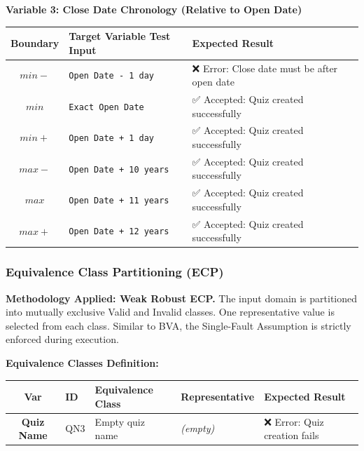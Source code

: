 \documentclass[twoside,final]{hcmut-report}
\begin{document}
\vspace{0.3cm}
\noindent\textbf{Variable 3: Close Date Chronology (Relative to Open Date)}
\begin{table}[H]
\centering
\renewcommand{\arraystretch}{1.2}
\begin{tabularx}{\textwidth}{|c|l|X|}
\hline
\textbf{Boundary} & \textbf{Target Variable Test Input} & \textbf{Expected Result} \\ \hline
$min-$ & \texttt{Open Date - 1 day} & ❌ Error: Close date must be after open date \\ \hline
$min$ & \texttt{Exact Open Date} & ✅ Accepted: Quiz created successfully \\ \hline
$min+$ & \texttt{Open Date + 1 day} & ✅ Accepted: Quiz created successfully \\ \hline
$max-$ & \texttt{Open Date + 10 years} & ✅ Accepted: Quiz created successfully \\ \hline
$max$ & \texttt{Open Date + 11 years} & ✅ Accepted: Quiz created successfully \\ \hline
$max+$ & \texttt{Open Date + 12 years} & ✅ Accepted: Quiz created successfully \\ \hline
\end{tabularx}
\end{table}

\subsubsection{Equivalence Class Partitioning (ECP)}
\textbf{Methodology Applied: Weak Robust ECP.}
The input domain is partitioned into mutually exclusive Valid and Invalid classes. One representative value is selected from each class. Similar to BVA, the Single-Fault Assumption is strictly enforced during execution.

\vspace{0.3cm}
\noindent\textbf{Equivalence Classes Definition:}
\begin{table}[H]
\centering
\renewcommand{\arraystretch}{1.2}
\begin{tabularx}{\textwidth}{|c|l|X|l|X|}
\hline
\textbf{Var} & \textbf{ID} & \textbf{Equivalence Class} & \textbf{Representative} & \textbf{Expected Result} \\ \hline
\textbf{Quiz Name} & QN3 & Empty quiz name & \textit{(empty)} & ❌ Error: Quiz creation fails \\ \hline
\end{tabularx}
\end{table}
\end{document}
